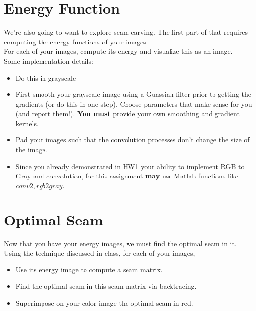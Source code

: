 \documentclass{article}
\begin{document}
\section{Energy Function}
We're also going to want to explore seam carving.  The first part of that requires computing the energy functions of your images.\\

\noindent
For each of your images, compute its energy and visualize this as an image.\\

\noindent
Some implementation details:
\begin{itemize}
\item Do this in grayscale
\item First smooth your grayscale image using a Guassian filter prior to getting the gradients (or do this in one step).  Choose parameters that make sense for you (and report them!).  \textbf{You must} provide your own smoothing and gradient kernels.
\item Pad your images such that the convolution processes don’t change the size of the image.
\item Since you already demonstrated in HW1 your ability to implement RGB to Gray and convolution, for this assignment \textbf{may} use Matlab functions like $conv2, rgb2gray$.
\end{itemize}

\begin{figure}[h!]
    \centering
\end{figure}

\newpage

\section{Optimal Seam}
Now that you have your energy images, we must find the optimal seam in it.\\

\noindent
Using the technique discussed in class, for each of your images, 

\begin{itemize}
\item Use its energy image to compute a seam matrix.
\item Find the optimal seam in this seam matrix via backtracing.
\item Superimpose on your color image the optimal seam in red.
\end{itemize}
\end{document}
